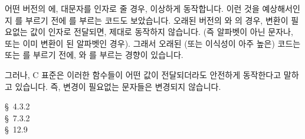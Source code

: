 \begin{faq}
	어떤 버전의 에, 대문자를 인자로 줄 경우,
	이상하게 동작합니다.  이런 것을 예상해서인지 를
	부르기 전에 를 부르는 코드도 보았습니다.
\A
	오래된 버전의 와 의 경우, 변환이 필요없는
	값이 인자로 전달되면, 제대로 동작하지 않습니다.  (즉 알파벳이 아닌
	문자나, 또는 이미 변환이 된 알파벳인 경우). 그래서 오래된 
        (또는 이식성이 아주 높은) 코드는  또는 를
        부르기 전에, 와 를 부르는 경향이 있습니다.

	그러나, C 표준은 이러한 함수들이 어떤 값이 전달되더라도
	안전하게 동작한다고 말하고 있습니다. 즉, 변경이 필요없는 문자들은
        변경되지 않습니다.

\R
	\cite{ansi} \S\ 4.3.2 \\
	\cite{c89} \S\ 7.3.2 \\
	\cite{hs} \S\ 12.9  \\
	\cite{pcs} 
\end{faq}


